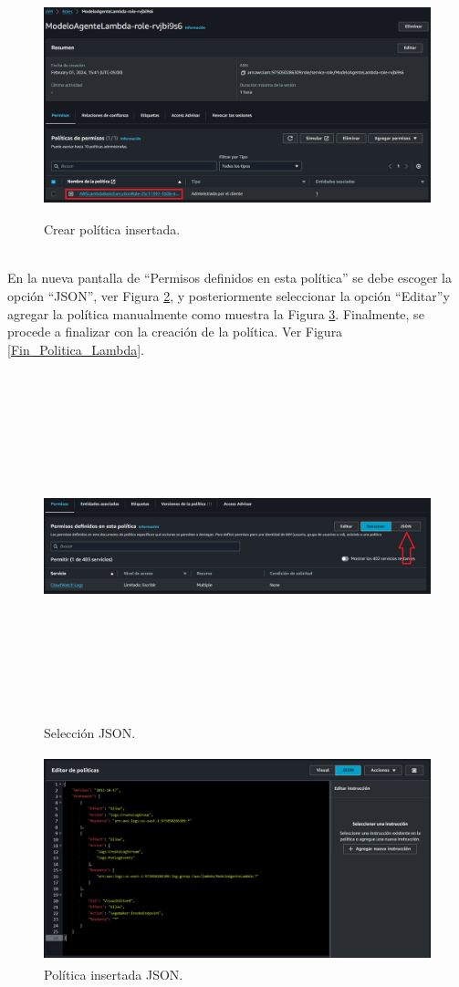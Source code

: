 \documentclass[a4paper,10pt, oneside, titlepage]{article}
\begin{document}
	\begin{figure}[!h]
		\centering
		\includegraphics[width = 1\linewidth, height = 6.5cm]{Politica_Insertada.png}
		\caption{Crear política insertada.}
		\label{Politica_Insertada}
	\end{figure} \\
	\indent En la nueva pantalla de ``Permisos definidos en esta política'' se debe escoger la opción ``JSON'', ver Figura \ref{Politica_JSON}, y posteriormente seleccionar la opción ``Editar''y agregar la política manualmente como muestra la Figura \ref{Agregar_JSON}. Finalmente, se procede a finalizar con la creación de la política. Ver Figura \ref{Fin_Politica_Lambda}.
	\begin{figure}[!h]
		\centering
		\includegraphics[width = 1\linewidth, height = 10.1cm]{Politica_JSON.png}
		\caption{Selección JSON.}
		\label{Politica_JSON}
	\end{figure}
	\begin{figure}[!h]
		\centering
		\includegraphics[width = 1\linewidth, height = 6cm]{Agregar_JSON.png}
		\caption{Política insertada JSON.}
		\label{Agregar_JSON}
	\end{figure}
\end{document}
